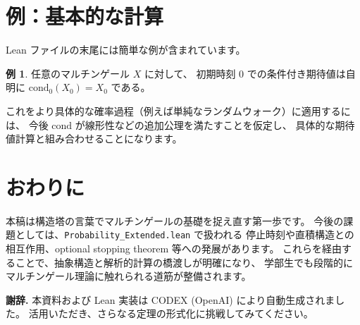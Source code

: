 \documentclass[12pt]{ltjsarticle}
\theoremstyle{definition}
\newtheorem{example}[definition]{例}
\theoremstyle{plain}
\begin{document}
\section{例：基本的な計算}

Lean ファイルの末尾には簡単な例が含まれています。

\begin{example}
  任意のマルチンゲール $X$ に対して、
  初期時刻 $0$ での条件付き期待値は自明に
  $\mathrm{cond}_0(X_0)=X_0$ である。
\end{example}

これをより具体的な確率過程（例えば単純なランダムウォーク）に適用するには、
今後 $\mathrm{cond}$ が線形性などの追加公理を満たすことを仮定し、
具体的な期待値計算と組み合わせることになります。

\section{おわりに}

本稿は構造塔の言葉でマルチンゲールの基礎を捉え直す第一歩です。
今後の課題としては、\texttt{Probability\_Extended.lean} で扱われる
停止時刻や直積構造との相互作用、optional stopping theorem 等への発展があります。
これらを経由することで、抽象構造と解析的計算の橋渡しが明確になり、
学部生でも段階的にマルチンゲール理論に触れられる道筋が整備されます。

\bigskip
\noindent\textbf{謝辞.}
本資料および Lean 実装は CODEX (OpenAI) により自動生成されました。
活用いただき、さらなる定理の形式化に挑戦してみてください。
\end{document}
